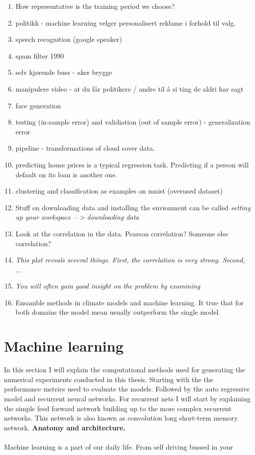 \begin{enumerate}
    \item How representative is the training period we choose?
    \item politikk - machine learning velger personalisert reklame i forhold til valg.
    \item speech recognition (google speaker)
    \item spam filter 1990
    \item selv kjørende buss - aker brygge 
    \item manipulere video - at du får politikere / andre til å si ting de aldri har sagt
    \item face generation
    \item testing (in-sample error) and validiation (out of sample error) - generalization error 
    \item pipeline - transformations of cloud cover data. 
    \item predicting house prices is a typical regression task. Predicting if a person will default on its loan is another one. 
    \item clustering and classification as examples on mnist (overused dataset)
    \item Stuff on downloading data and installing the envionment can be called \textit{setting up your workspace -- > downloading data}
    \item Look at the correlation in the data. Pearson correlation? Someone else correlation?
    \item \textit{This plot reveals several things. First, the correlation is very strong. Second, ... }
    \item \textit{You will often gain good insight on the problem by examining }
    \item Ensamble methods in climate models and machine learning. It true that for both domains the model mean usually outperform the single model.
\end{enumerate}


\section{Machine learning} \label{sec:intro_machine_learning}
In this section I will explain the computational methods used for generating the numerical experiments conducted in this thesis. Starting with the the performance metrics used to evaluate the models. Followed by the auto regressive model and recurrent neural networks. For recurrent nets I will start by explaining the simple feed forward network building up to the more complex recurrent networks. This network is also known as convolution long short-term memory network. \textbf{Anatomy and architecture.} 
\\ \\
Machine learning is a part of our daily life. From self driving bussed in  your 

